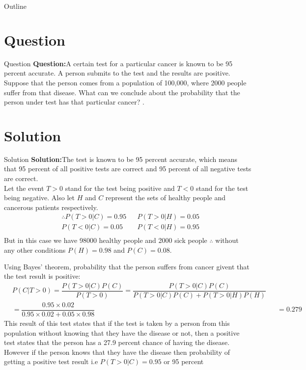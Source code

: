 \documentclass{beamer}
\begin{document}
\begin{frame}
    \titlepage 
  \end{frame}
  \logo{}
  \begin{frame}{Outline}
    \tableofcontents
  \end{frame}
       \section{Question}
       \begin{frame}{Question}
       \textbf{Question:}A certain test for a particular cancer is known to be 95 percent accurate. A person submits to the test and the results are positive. Suppose that the person comes from a population
of 100,000, where 2000 people suffer from that disease. What can we conclude about the probability that the person under test has that particular cancer? .\\
        \end{frame}
        \section{Solution}
        \begin{frame}{Solution}
       \textbf{Solution:}The test is known to be 95 percent accurate, which means that 95 percent of all positive tests are correct and 95 percent of all negative tests are correct.\\
        Let the event $T>0$ stand for the test being positive and $T<0$ stand for the test being negative. Also let $H$ and $C$ represent the sets of healthy people and cancerous patients respectively.\\
        \begin{align}
        &\therefore P(T>0|C)= 0.95 && P(T>0|H)= 0.05\\
        &P(T<0|C)= 0.05 && P(T<0|H)= 0.95\\
        \end{align}
        But in this case we have 98000 healthy people and 2000 sick people $\therefore$ without any other conditions $P(H)=0.98$  and $P(C)=0.08$. 
        \end{frame}
        \begin{frame}
        Using Bayes' theorem, probability that the person suffers from cancer givent that the test result is positive:
        \begin{align}
        & P(C|T>0)= \dfrac{P(T>0|C)P(C)}{P(T>0)}= \dfrac{P(T>0|C)P(C)}{P(T>0|C)P(C)+P(T>0|H)P(H)}\nonumber \\
        & = \dfrac{0.95\times0.02}{0.95\times0.02+0.05\times0.98} &&=0.279 \nonumber
        \end{align}
        This result of this test states that if the test is taken by a person from this population without knowing that they have the disease or not, then a positive test states that the person has a 27.9 percent chance of having the disease. However if the person knows that they have the disease then probability of getting a positive test result i.e $P(T>0|C)=0.95$ or 95 percent \\
        \end{frame}
\end{document}
